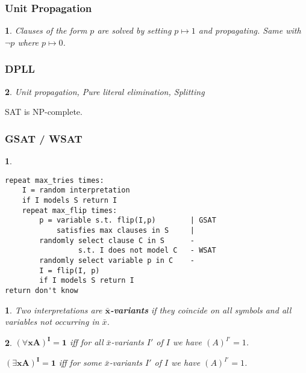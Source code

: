 \documentclass[9pt]{extarticle}
\theoremstyle{theoremstyle}
\newtheorem*{green}{}
\newtheorem*{red}{}
\newtheorem*{blue}{}
\begin{document}
\begin{multicols}{3}
\begin{minipage}[t]{.30\textwidth}
\subsubsection*{Unit Propagation}
\begin{blue}
Clauses of the form $p$ are solved by setting $p \mapsto 1$ and propagating. Same with $\lnot p$ where $p \mapsto 0$.
\end{blue}

\end{minipage}\hfil

\begin{minipage}[t]{.30\textwidth}

\subsubsection*{DPLL}
\begin{blue}
	Unit propagation, Pure literal elimination, Splitting
\end{blue}

SAT is NP-complete.

\subsubsection*{GSAT / WSAT}
\begin{red}
\begin{verbatim}
repeat max_tries times:
    I = random interpretation
    if I models S return I
    repeat max_flip times:
        p = variable s.t. flip(I,p)        | GSAT
            satisfies max clauses in S     |
        randomly select clause C in S      -
                 s.t. I does not model C   - WSAT
        randomly select variable p in C    -
        I = flip(I, p)
        if I models S return I
return don't know	
\end{verbatim}
\end{red}

\begin{green}
Two interpretations are \textbf{$\mathbf{\bar{x}}$-variants} if they coincide on all symbols and all variables not occurring in $\bar{x}$.
\end{green}

\begin{green}
$\mathbf{(\forall x A)^I = 1}$ iff for all $\bar{x}$-variants $I'$ of $I$ we have $(A)^{I'} = 1$.

$\mathbf{(\exists x A)^I = 1}$ iff for some $\bar{x}$-variants $I'$ of $I$ we have $(A)^{I'} = 1$.
\end{green}


\end{minipage}
\end{multicols}
\end{document}
